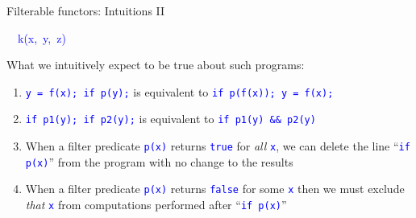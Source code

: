 \documentclass[english]{beamer}
\newenvironment{lyxcode}
   {\par\begin{list}{}{
     \setlength{\rightmargin}{\leftmargin}
     \setlength{\listparindent}{0pt}%
     \raggedright
     \setlength{\itemsep}{0pt}
     \setlength{\parsep}{0pt}
     \normalfont\ttfamily}%
    \def\{{\char`\{}
    \def\}{\char`\}}
    \def\textasciitilde{\char`\~}
    \item[]}
   {\end{list}}
\begin{document}
\begin{frame}{Filterable functors: Intuitions II}
\begin{itemize}
\begin{lyxcode}
\textcolor{blue}{\footnotesize{}~~k(x,~y,~z)}{\footnotesize \par}
\end{lyxcode}
\item What we intuitively expect to be true about such programs:
\begin{enumerate}
\item \texttt{\textcolor{blue}{\footnotesize{}y = f(x); if p(y);}} is equivalent
to \texttt{\textcolor{blue}{\footnotesize{}if p(f(x)); y = f(x);}} 
\item \texttt{\textcolor{blue}{\footnotesize{}if p1(y); if p2(y);}} is equivalent
to \texttt{\textcolor{blue}{\footnotesize{}if p1(y) \&\& p2(y)}} 
\item When a filter predicate \texttt{\textcolor{blue}{\footnotesize{}p(x)}}
returns \texttt{\textcolor{blue}{\footnotesize{}true}} for \emph{all}
\texttt{\textcolor{blue}{\footnotesize{}x}}, we can delete the line
``\texttt{\textcolor{blue}{\footnotesize{}if p(x)}}'' from the program
with no change to the results
\item When a filter predicate \texttt{\textcolor{blue}{\footnotesize{}p(x)}}
returns \texttt{\textcolor{blue}{\footnotesize{}false}} for some \texttt{\textcolor{blue}{\footnotesize{}x}}
then we must exclude\emph{ that} \texttt{\textcolor{blue}{\footnotesize{}x}}
from computations performed after ``\texttt{\textcolor{blue}{\footnotesize{}if
p(x)}}''
\end{enumerate}
\end{itemize}
\end{frame}
\end{document}
